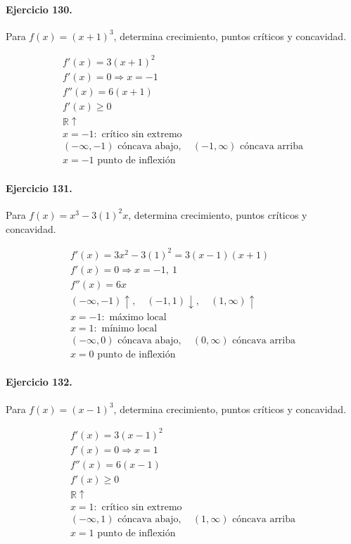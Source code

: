 \documentclass[11pt,a4paper]{article}
\begin{document}
\paragraph{Ejercicio 130.} Para $f(x)=(x+1)^3$, determina crecimiento, puntos críticos y concavidad.

\[
\begin{aligned}
f'(x)=3(x+1)^2\\
f'(x)=0\Rightarrow x=-1\\
f''(x)=6(x+1)\\
f'(x)\ge0\\
\mathbb{R}\uparrow\\
x=-1:\text{ crítico sin extremo}\\
(-\infty,-1)\text{ cóncava abajo},\quad(-1,\infty)\text{ cóncava arriba}\\
x=-1\text{ punto de inflexión}
\end{aligned}
\]


\paragraph{Ejercicio 131.} Para $f(x)=x^3-3(1)^2x$, determina crecimiento, puntos críticos y concavidad.

\[
\begin{aligned}
f'(x)=3x^2-3(1)^2=3(x-1)(x+1)\\
f'(x)=0\Rightarrow x=-1,\ 1\\
f''(x)=6x\\
(-\infty,-1)\uparrow,\quad(-1,1)\downarrow,\quad(1,\infty)\uparrow\\
x=-1:\text{ máximo local}\\
x=1:\text{ mínimo local}\\
(-\infty,0)\text{{ cóncava abajo}},\quad(0,\infty)\text{{ cóncava arriba}}\\
x=0\text{{ punto de inflexión}}
\end{aligned}
\]


\paragraph{Ejercicio 132.} Para $f(x)=(x-1)^3$, determina crecimiento, puntos críticos y concavidad.

\[
\begin{aligned}
f'(x)=3(x-1)^2\\
f'(x)=0\Rightarrow x=1\\
f''(x)=6(x-1)\\
f'(x)\ge0\\
\mathbb{R}\uparrow\\
x=1:\text{ crítico sin extremo}\\
(-\infty,1)\text{ cóncava abajo},\quad(1,\infty)\text{ cóncava arriba}\\
x=1\text{ punto de inflexión}
\end{aligned}
\]
\end{document}
